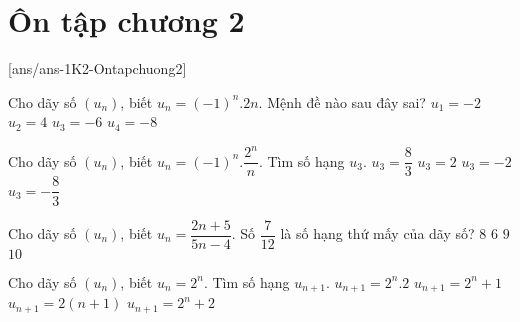 \setcounter{dang}{0}
\setcounter{ex}{0}
\setcounter{bt}{0}
\setcounter{vd}{0}
\section*{Ôn tập chương 2}
[ans/ans-1K2-Ontapchuong2]
\begin{ex}%
	Cho dãy số $\left(u_n\right)$, biết $u_n=\left(-1\right)^n.2n$. Mệnh đề nào sau đây sai?
	\choice
	{$u_1=-2$}
	{$u_2=4$}
	{$u_3=-6$}
	{\True $u_4=-8$}
\end{ex}
\begin{ex}%
	Cho dãy số $\left(u_n\right)$, biết $u_n=\left(-1\right)^n.\dfrac{2^n}{n}$. Tìm số hạng $u_3$.
	\choice
	{$u_3=\dfrac{8}{3}$}
	{$u_3=2$}
	{$u_3=-2$}
	{\True $u_3=-\dfrac{8}{3}$}
\end{ex}
\begin{ex}%
	Cho dãy số $\left(u_n\right)$, biết $u_n=\dfrac{2n+5}{5n-4}$. Số $\dfrac{7}{12}$ là số hạng thứ mấy của dãy số?
	\choice
	{\True $8$}
	{$6$}
	{$9$}
	{$10$}
\end{ex}
\begin{ex}%
	Cho dãy số $\left(u_n\right)$, biết $u_n=2^n$. Tìm số hạng $u_{n+1}$.
	\choice
	{\True $u_{n+1}=2^n.2$}
	{$u_{n+1}=2^n+1$}
	{$u_{n+1}=2\left(n+1\right)$}
	{$u_{n+1}=2^n+2$}
\end{ex}
